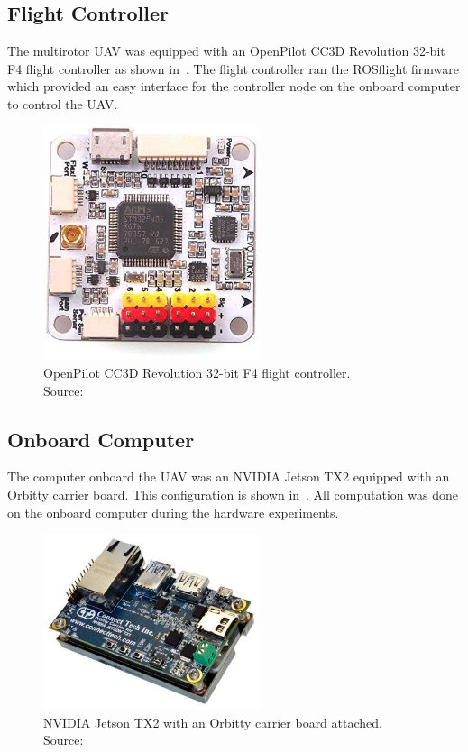 \subsection{Flight Controller}
The multirotor UAV was equipped with an OpenPilot CC3D Revolution 32-bit F4
flight controller as shown in~. The flight controller ran the
ROSflight firmware which provided an easy interface
for the controller node on the onboard computer to control the UAV.

\begin{figure}[htbp]
  \centering
  \includegraphics[width=2.5in]{figures/f4.jpg}
  \caption[OpenPilot CC3D Revolution 32-bit F4]{OpenPilot CC3D Revolution 32-bit
    F4 flight controller. \\ \hspace{\textwidth} Source:~\cite{openpilotrevo}
}
%
  \label{fig:f4}
\end{figure}

\subsection{Onboard Computer}
The computer onboard the UAV was an NVIDIA Jetson TX2 equipped with an Orbitty
carrier board. This configuration is shown in~. All
computation was done on the onboard computer during the hardware experiments.

\begin{figure}[h]
  \centering
  \includegraphics[width=2.5in]{figures/tx2_orbitty.jpg}
  \caption[NVIDIA Jetson TX2 with Orbitty Carrier Board]{NVIDIA Jetson TX2
  with an Orbitty carrier board attached. \\\hspace{\textwidth} Source:~\cite{orbitty}
  }
  \label{fig:tx2_orbitty}
\end{figure}

